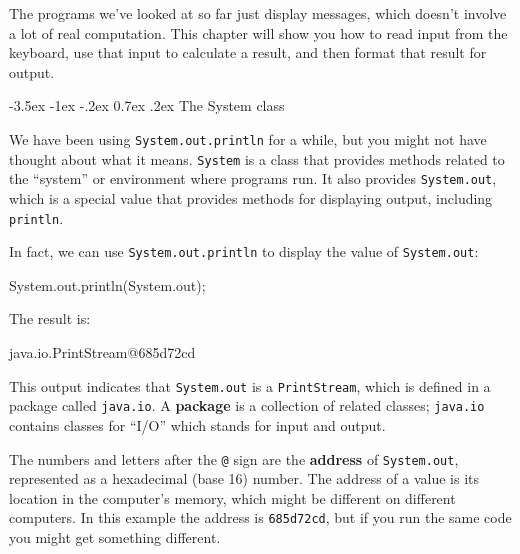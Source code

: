 \documentclass[12pt]{book}
\makeatletter
\theoremstyle{exercise}
\newcommand{\java}[1]{\verb"#1"}
\renewcommand{\section}{\@startsection{section}{1}{\z@}%
    {-3.5ex \@plus -1ex \@minus -.2ex}%
    {0.7ex \@plus.2ex}%
    {\normalfont\Large\bfseries}}
\newcommand{\java}[1]{\lstinline{#1}} %
\makeatother
\begin{document}


The programs we've looked at so far just display messages, which doesn't involve a lot of real computation.
This chapter will show you how to read input from the keyboard, use that input to calculate a result, and then format that result for output.


\section{The System class}
\label{sec:system}


We have been using {\tt System.out.println} for a while, but you might not have thought about what it means.
\java{System} is a class that provides methods related to the ``system'' or environment where programs run.
It also provides \java{System.out}, which is a special value that provides methods for displaying output, including \java{println}.

In fact, we can use \java{System.out.println} to display the value of \java{System.out}:

\begin{code}
    System.out.println(System.out);
\end{code}

The result is:

\begin{stdout}
java.io.PrintStream@685d72cd
\end{stdout}


This output indicates that \java{System.out} is a \java{PrintStream}, which is defined in a package called \java{java.io}.
A {\bf package} is a collection of related classes; \java{java.io} contains classes for ``I/O'' which stands for input and output.


The numbers and letters after the {\tt @} sign are the {\bf address} of \java{System.out}, represented as a hexadecimal (base 16) number.
The address of a value is its location in the computer's memory, which might be different on different computers.
In this example the address is \java{685d72cd}, but if you run the same code you might get something different.
\end{document}
